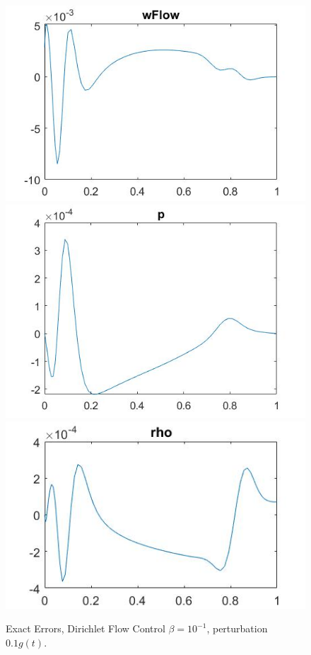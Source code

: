 \documentclass[11pt, a4paper]{article}
\theoremstyle{definition}
\begin{document}
\begin{figure}[h]
	\includegraphics[scale=0.3]{KalD1.jpg}
	\includegraphics[scale=0.2]{KalD2.jpg}
	\includegraphics[scale=0.25]{KalD3.jpg}
	\caption{Exact Errors, Dirichlet Flow Control $\beta = 10^{-1}$, perturbation $0.1g(t)$.}
	\label{FigKal2}
\end{figure}
\end{document}
